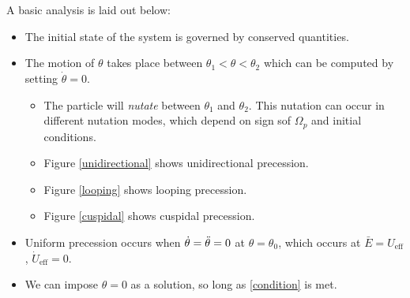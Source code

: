 \documentclass{book}
\begin{document}
\\\\
A basic analysis is laid out below:
\begin{itemize}
	\item The initial state of the system is governed by conserved quantities.
	\item The motion of $\theta$ takes place between $\theta_1 < \theta < \theta_2$ which can be computed by setting $\Dot{\theta} = 0$.
	\begin{itemize}
		\item The particle will \textit{nutate} between $\theta_1$ and $\theta_2$. This nutation can occur in different nutation modes, which depend on sign sof $\Omega_p$ and initial conditions.
		\item Figure \ref{unidirectional} shows unidirectional precession.
		\item Figure \ref{looping} shows looping precession.
		\item Figure \ref{cuspidal} shows cuspidal precession.
	\end{itemize}
	\item Uniform precession occurs when $\Dot{\theta} = \Ddot{\theta} = 0$ at $\theta = \theta_0$, which occurs at $\bar{E} = U_{\text{eff}}$, $\Dot{U}_{\text{eff}} = 0$.
	\item We can impose $\theta = 0$ as a solution, so long as \eqref{condition} is met.
\end{itemize}
\end{document}
